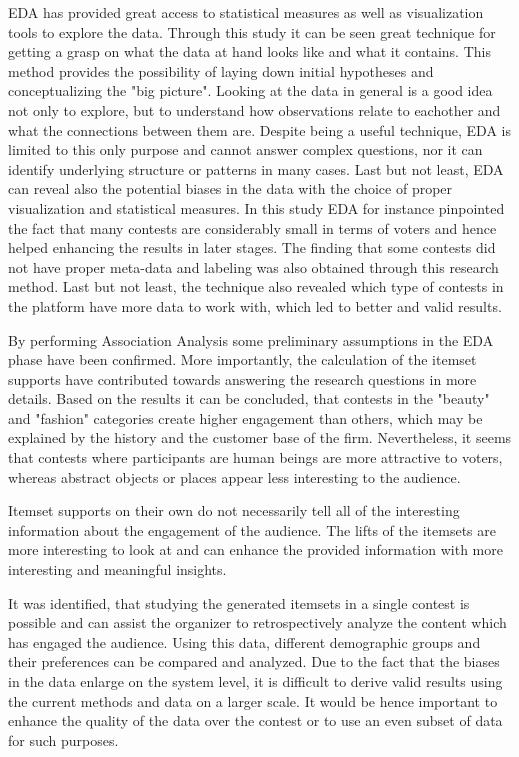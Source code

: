 EDA has provided great access to statistical measures as well as visualization tools to explore the data. Through this study it can be seen great technique for getting a grasp on what the data at hand looks like and what it contains. This method provides the possibility of laying down initial hypotheses and conceptualizing the "big picture". Looking at the data in general is a good idea not only to explore, but to understand how observations relate to eachother and what the connections between them are. Despite being a useful technique, EDA is limited to this only purpose and cannot answer complex questions, nor it can identify underlying structure or patterns in many cases. Last but not least, EDA can reveal also the potential biases in the data with the choice of proper visualization and statistical measures. In this study EDA for instance pinpointed the fact that many contests are considerably small in terms of voters and hence helped enhancing the results in later stages. The finding that some contests did not have proper meta-data and labeling was also obtained through this research method. Last but not least, the technique also revealed which type of contests in the platform have more data to work with, which led to better and valid results. 

By performing Association Analysis some preliminary assumptions in the EDA phase have been confirmed. More importantly, the calculation of the itemset supports have contributed towards answering the research questions in more details. Based on the results it can be concluded, that contests in the "beauty" and "fashion" categories create higher engagement than others, which may be explained by the history and the customer base of the firm. Nevertheless, it seems that contests where participants are human beings are more attractive to voters, whereas abstract objects or places appear less interesting to the audience. 

Itemset supports on their own do not necessarily tell all of the interesting information about the engagement of the audience. The lifts of the itemsets are more interesting to look at and can enhance the provided information with more interesting and meaningful insights. 

It was identified, that studying the generated itemsets in a single contest is possible and can assist the organizer to retrospectively analyze the content which has engaged the audience. Using this data, different demographic groups and their preferences can be compared and analyzed. Due to the fact that the biases in the data enlarge on the system level, it is difficult to derive valid results using the current methods and data on a larger scale. It would be hence important to enhance the quality of the data over the contest or to use an even subset of data for such purposes.

